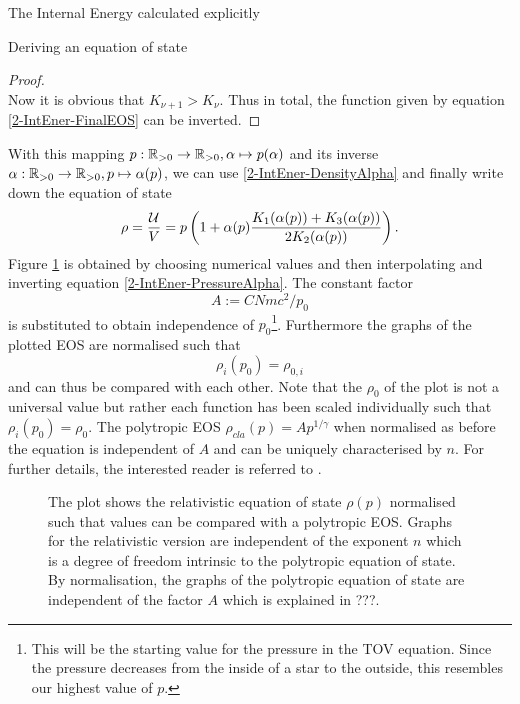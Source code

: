 \begin{section}{The Internal Energy calculated explicitly}
\begin{subsection}{Deriving an equation of state}
\begin{proof}
\begin{equation}
	\end{equation}
	Now it is obvious that $K_{\nu+1}>K_\nu$. Thus in total, the function given by equation \ref{2-IntEner-FinalEOS} can be inverted.
\end{proof}%
%
%
\noindent With this mapping $p:\mathbb{R}_{>0}\rightarrow \mathbb{R}_{>0},\alpha\mapsto p(\alpha)$ and its inverse $\alpha:\mathbb{R}_{>0}\rightarrow \mathbb{R}_{>0},p\mapsto \alpha(p)$, we can use \ref{2-IntEner-DensityAlpha} and finally write down the equation of state 
\begin{equation}
	\rho = \frac{\mathcal{U}}{V} = p\left(1+\alpha(p)\frac{K_1(\alpha(p))+K_3(\alpha(p))}{2K_2(\alpha(p))}\right).
	\label{2-IntEner-FinalEOS}
\end{equation}
Figure \ref{2-IntEner-RelEOSPlot} is obtained by choosing numerical values and then interpolating and inverting equation \ref{2-IntEner-PressureAlpha}. The constant factor 
\begin{equation}
	A:=CNmc^2/p_0
\end{equation}
is substituted to obtain independence of $p_0$\footnote{This will be the starting value for the pressure in the TOV equation. Since the pressure decreases from the inside of a star to the outside, this resembles our highest value of $p$.}. Furthermore the graphs of the plotted EOS are normalised such that
\begin{equation}
	\rho_{i}(p_0)=\rho_{0,i}
\end{equation}
and can thus be compared with each other. Note that the $\rho_0$ of the plot is not a universal value but rather each function has been scaled individually such that $\rho_{i}(p_0)=\rho_0$. The polytropic EOS $\rho_{cla}(p)=Ap^{1/\gamma}$ when normalised as before the equation is independent of $A$ and can be uniquely characterised by $n$. For further details, the interested reader is referred to \cite{pleyerGithubRepositoryJonas}.
\begin{figure}[H]
	\centering
	
	\caption[Relativistic Equation of State]{The plot shows the relativistic equation of state $\rho(p)$ normalised such that values can be compared with a polytropic EOS. Graphs for the relativistic version are independent of the exponent $n$ which is a degree of freedom intrinsic to the polytropic equation of state. By normalisation, the graphs of the polytropic equation of state are independent of the factor $A$ which is explained in ???.} %
	\label{2-IntEner-RelEOSPlot}
\end{figure}
\end{subsection}
%
%
\end{section}
